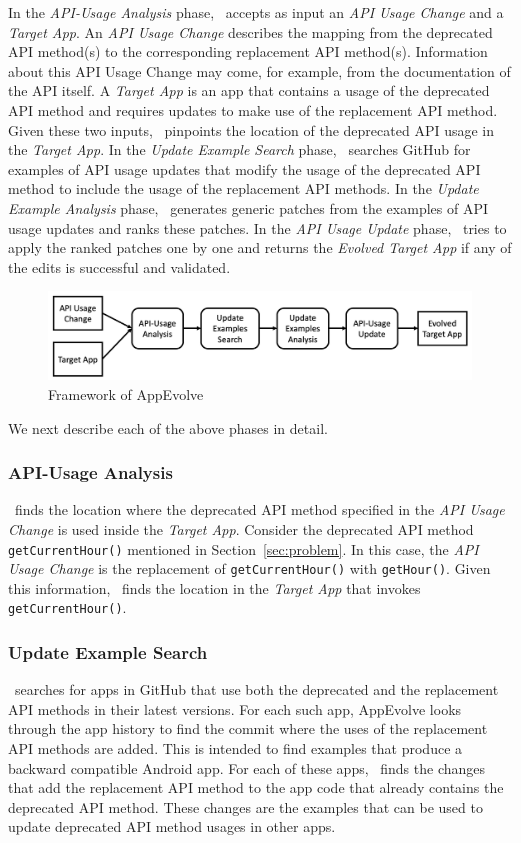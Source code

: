 In the {\em API-Usage Analysis} phase, \toolname\ accepts as input an {\em
  API Usage Change} and a {\em Target App}. An {\em API Usage Change}
describes the mapping from the deprecated API method(s) to the
corresponding replacement API method(s).  Information about this API Usage
Change may come, for example, from the documentation of the API itself. A
{\em Target App} is an app that contains a usage of the deprecated API
method and requires updates to make use of the replacement API
method. Given these two inputs, \toolname\ pinpoints the location of the
deprecated API usage in the {\em Target App}. In the {\em Update Example
  Search} phase, \toolname\ searches GitHub for examples of API usage
updates that modify the usage of the deprecated API method to include the
usage of the replacement API methods. In the {\em Update Example Analysis}
phase, \toolname\ generates generic patches from the examples of API usage
updates and ranks these patches. In the {\em API Usage Update} phase,
\toolname\ tries to apply the ranked patches one by one and returns the
                 {\em Evolved Target App} if any of the edits is successful
                 and validated.

\begin{figure}[t]
	\centering
	\includegraphics[width=0.8\linewidth]{framework.png}
	\caption{Framework of AppEvolve}
	\label{fig:framework}
\end{figure}

We next describe each of the above phases in detail.
\subsubsection{API-Usage Analysis}
\toolname\ finds the location where the deprecated API method specified in
the {\em API Usage Change} is used inside the {\em Target App}. Consider
the deprecated API method \texttt{getCurrentHour()} mentioned in
Section~\ref{sec:problem}.  In this case, the {\em API Usage Change} is the
replacement of \texttt{getCurrentHour()} with \texttt{getHour()}. Given
this information, \toolname\ finds the location in the {\em Target App}
that invokes \texttt{getCurrentHour()}.

\subsubsection{Update Example Search}
\toolname\ searches for apps in GitHub that use both the deprecated and the
replacement API methods in their latest versions.  For each such app,
AppEvolve looks through the app history to find the commit where the uses
of the replacement API methods are added. This is intended to find examples
that produce a backward compatible Android app.  For each of these apps,
\toolname\ finds the changes that add the replacement API method to the app
code that already contains the deprecated API method. These changes are the
examples that can be used to update deprecated API method usages in other
apps.

